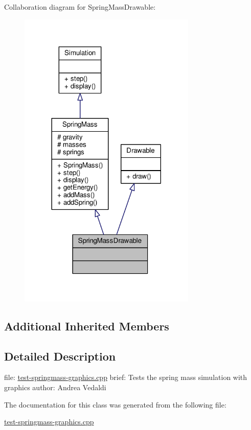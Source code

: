 Collaboration diagram for Spring\+Mass\+Drawable\+:
\nopagebreak
\begin{figure}[H]
\begin{center}
\leavevmode
\includegraphics[width=240pt]{classSpringMassDrawable__coll__graph}
\end{center}
\end{figure}
\subsection*{Additional Inherited Members}


\subsection{Detailed Description}
file\+: \hyperlink{test-springmass-graphics_8cpp}{test-\/springmass-\/graphics.\+cpp} brief\+: Tests the spring mass simulation with graphics author\+: Andrea Vedaldi 

The documentation for this class was generated from the following file\+:\begin{DoxyCompactItemize}
\item 
\hyperlink{test-springmass-graphics_8cpp}{test-\/springmass-\/graphics.\+cpp}\end{DoxyCompactItemize}
